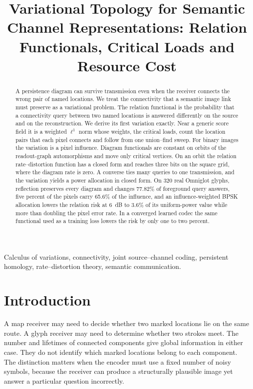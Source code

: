 \documentclass[10pt,conference]{IEEEtran}
\title{Variational Topology for Semantic Channel Representations: Relation Functionals, Critical Loads and Resource Cost}
\author{} %
\begin{document}
\maketitle
\begin{abstract}
A persistence diagram can survive transmission even when the receiver connects the wrong pair of named locations. We treat the connectivity that a semantic image link must preserve as a variational problem. The relation functional is the probability that a connectivity query between two named locations is answered differently on the source and on the reconstruction. We derive its first variation exactly. Near a generic score field it is a weighted $\ell^1$ norm whose weights, the critical loads, count the location pairs that each pixel connects and follow from one union--find sweep. For binary images the variation is a pixel influence. Diagram functionals are constant on orbits of the readout-graph automorphisms and move only critical vertices. On an orbit the relation rate--distortion function has a closed form and reaches three bits on the square grid, where the diagram rate is zero. A converse ties many queries to one transmission, and the variation yields a power allocation in closed form. On 320 real Omniglot glyphs, reflection preserves every diagram and changes 77.82\% of foreground query answers, five percent of the pixels carry 65.6\% of the influence, and an influence-weighted BPSK allocation lowers the relation risk at 6~dB to 3.6\% of its uniform-power value while more than doubling the pixel error rate. In a converged learned codec the same functional used as a training loss lowers the risk by only one to two percent.
\end{abstract}
\begin{IEEEkeywords}
Calculus of variations, connectivity, joint source--channel coding, persistent homology, rate--distortion theory, semantic communication.
\end{IEEEkeywords}

\section{Introduction}
A map receiver may need to decide whether two marked locations lie on the same route. A glyph receiver may need to determine whether two strokes meet. The number and lifetimes of connected components give global information in either case. They do not identify which marked locations belong to each component. The distinction matters when the encoder must use a fixed number of noisy symbols, because the receiver can produce a structurally plausible image yet answer a particular question incorrectly.
\end{document}
